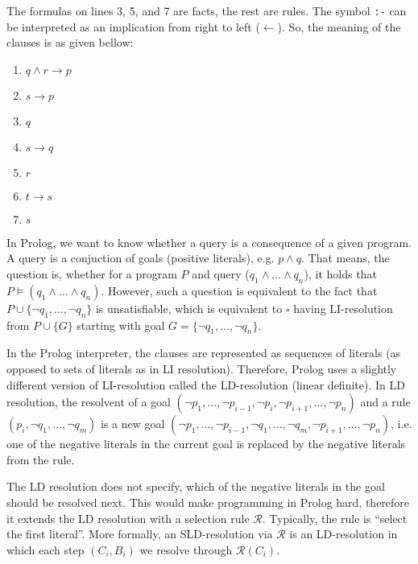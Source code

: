 The formulas on lines 3, 5, and 7 are facts, the rest are rules. The symbol \texttt{:-} can be interpreted as an implication from right to left ($\leftarrow$). So, the meaning of the clauses is as given bellow:

\begin{multicols}{2}
\begin{enumerate}
  \item $q \land r \to p$
  \item $s \to p$
  \item $q$
  \item $s \to q$
  \columnbreak
  \item $r$
  \item $t \to s$
  \item $s$
\end{enumerate}
\end{multicols}

In Prolog, we want to know whether a query is a consequence of a given program. A query is a conjuction of goals (positive literals), e.g. $p \land q$. That means, the question is, whether for a program $P$ and query ($q_1 \land \dots \land q_n$), it holds that $P \vDash (q_1 \land \dots \land q_n)$. However, such a question is equivalent to the fact that $P \cup \{\neg q_1, \dots, \neg q_n\}$ is unsatisfiable, which is equivalent to $\square$ having LI-resolution from $P \cup \{G\}$ starting with goal $G = \{\neg q_1, \dots, \neg q_n\}$.

In the Prolog interpreter, the clauses are represented as sequences of literals (as opposed to sets of literals as in LI resolution). Therefore, Prolog uses a slightly different version of LI-resolution called the LD-resolution (linear definite). In LD resolution, the resolvent of a goal $(\neg p_1, \dots, \neg p_{i-1}, \neg p_i, \neg p_{i+1}, \dots, \neg p_n)$ and a rule $(p_i, \neg q_1, \dots, \neg q_m)$ is a new goal $(\neg p_1, \dots, \neg p_{i-1}, \neg q_1, \dots, \neg q_m, \neg p_{i+1}, \dots, \neg p_n)$, i.e. one of the negative literals in the current goal is replaced by the negative literals from the rule. 

The LD resolution does not specify, which of the negative literals in the goal should be resolved next. This would make programming in Prolog hard, therefore it extends the LD resolution with a selection rule $\mathcal{R}$. Typically, the rule is ``select the first literal''. More formally, an SLD-resolution via $\mathcal{R}$ is an LD-resolution in which each step $(C_i, B_i)$ we resolve through $\mathcal{R}(C_i)$.

